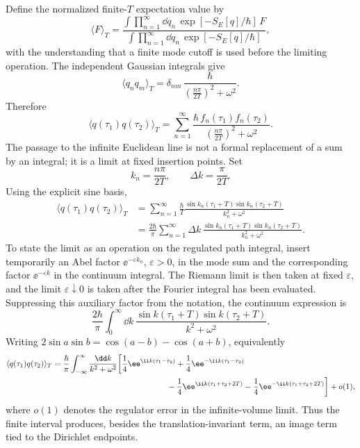Define the normalized finite-\(T\) expectation value by
\[
  \langle F\rangle_T
  =
  \frac{
    \int\prod_{n=1}^{\infty}\dd q_n\,
    \exp[-S_E[q]/\hbar]\,F
  }{
    \int\prod_{n=1}^{\infty}\dd q_n\,
    \exp[-S_E[q]/\hbar]
  },
\]
with the understanding that a finite mode cutoff is used before the limiting
operation. The independent Gaussian integrals give
\[
  \langle q_nq_m\rangle_T
  =
  \delta_{nm}\,
  \frac{\hbar}{
    \left(\frac{n\pi}{2T}\right)^2+\omega^2
  }.
\]
Therefore
\[
  \langle q(\tau_1)q(\tau_2)\rangle_T
  =
  \sum_{n=1}^{\infty}
  \frac{\hbar\,f_n(\tau_1)f_n(\tau_2)}
       {\left(\frac{n\pi}{2T}\right)^2+\omega^2}.
\]
The passage to the infinite Euclidean line is not a formal replacement of a
sum by an integral; it is a limit at fixed insertion points.  Set
\[
  k_n=\frac{n\pi}{2T},
  \qquad
  \Delta k=\frac{\pi}{2T}.
\]
Using the explicit sine basis,
\[
\begin{aligned}
  \langle q(\tau_1)q(\tau_2)\rangle_T
  &=
  \sum_{n=1}^{\infty}
  \frac{\hbar}{T}
  \frac{
    \sin k_n(\tau_1+T)\sin k_n(\tau_2+T)
  }{k_n^2+\omega^2}  \\
  &=
  \frac{2\hbar}{\pi}
  \sum_{n=1}^{\infty}\Delta k\,
  \frac{
    \sin k_n(\tau_1+T)\sin k_n(\tau_2+T)
  }{k_n^2+\omega^2}.
\end{aligned}
\]
To state the limit as an operation on the regulated path integral, insert
temporarily an Abel factor \(\ee^{-\varepsilon k_n}\), \(\varepsilon>0\), in
the mode sum and the corresponding factor \(\ee^{-\varepsilon k}\) in the
continuum integral.  The Riemann limit is then taken at fixed
\(\varepsilon\), and the limit \(\varepsilon\downarrow0\) is taken after the
Fourier integral has been evaluated.  Suppressing this auxiliary factor from
the notation, the continuum expression is
\[
  \frac{2\hbar}{\pi}
  \int_{0}^{\infty}\dd k\,
  \frac{
    \sin k(\tau_1+T)\sin k(\tau_2+T)
  }{k^2+\omega^2}.
\]
Writing \(2\sin a\sin b=\cos(a-b)-\cos(a+b)\), equivalently
\[
\begin{aligned}
  \langle q(\tau_1)q(\tau_2)\rangle_T
  &=
  \frac{\hbar}{\pi}
  \int_{-\infty}^{\infty}\frac{\dd k}{k^2+\omega^2}
  \biggl[
    \frac14\ee^{\ii k(\tau_1-\tau_2)}
    +\frac14\ee^{-\ii k(\tau_1-\tau_2)}  \\
  &\hspace{5.0cm}
    -\frac14\ee^{\ii k(\tau_1+\tau_2+2T)}
    -\frac14\ee^{-\ii k(\tau_1+\tau_2+2T)}
  \biggr]
  +o(1),
\end{aligned}
\]
where \(o(1)\) denotes the regulator error in the infinite-volume limit.
Thus the finite interval produces, besides the translation-invariant term, an
image term tied to the Dirichlet endpoints.

